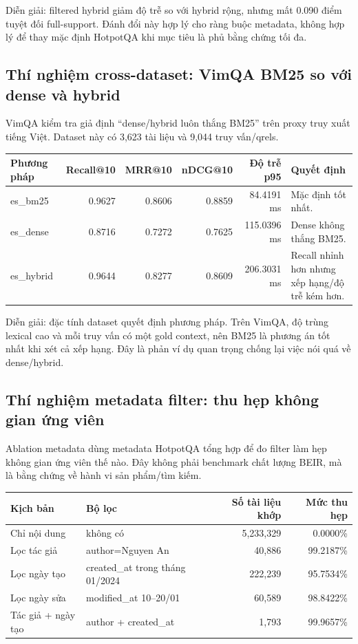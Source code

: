 \documentclass[11pt,a4paper]{article}
\begin{document}
Diễn giải: filtered hybrid giảm độ trễ so với hybrid rộng, nhưng mất 0.090 điểm tuyệt đối
full-support. Đánh đổi này hợp lý cho ràng buộc metadata, không hợp lý để thay mặc định
HotpotQA khi mục tiêu là phủ bằng chứng tối đa.

\subsection{Thí nghiệm cross-dataset: VimQA BM25 so với dense và hybrid}

VimQA kiểm tra giả định ``dense/hybrid luôn thắng BM25'' trên proxy truy xuất tiếng Việt.
Dataset này có 3,623 tài liệu và 9,044 truy vấn/qrels.

\small
\begin{tabularx}{\textwidth}{>{\ttfamily\raggedright\arraybackslash}p{} r r r r Y}
\toprule
Phương pháp & Recall@10 & MRR@10 & nDCG@10 & Độ trễ p95 & Quyết định \\
\midrule
es\_bm25 & 0.9627 & 0.8606 & 0.8859 & 84.4191 ms & Mặc định tốt nhất. \\
es\_dense & 0.8716 & 0.7272 & 0.7625 & 115.0396 ms & Dense không thắng BM25. \\
es\_hybrid & 0.9644 & 0.8277 & 0.8609 & 206.3031 ms & Recall nhỉnh hơn nhưng xếp hạng/độ trễ kém hơn. \\
\bottomrule
\end{tabularx}
\normalsize

Diễn giải: đặc tính dataset quyết định phương pháp. Trên VimQA, độ trùng lexical cao và mỗi truy vấn
có một gold context, nên BM25 là phương án tốt nhất khi xét cả xếp hạng. Đây là phản ví dụ quan trọng chống
lại việc nói quá về dense/hybrid.

\subsection{Thí nghiệm metadata filter: thu hẹp không gian ứng viên}

Ablation metadata dùng metadata HotpotQA tổng hợp để đo filter làm hẹp không gian ứng viên thế nào.
Đây không phải benchmark chất lượng BEIR, mà là bằng chứng về hành vi sản phẩm/tìm kiếm.

\small
\begin{tabularx}{\textwidth}{>{\raggedright\arraybackslash}p{} Y r r}
\toprule
Kịch bản & Bộ lọc & Số tài liệu khớp & Mức thu hẹp \\
\midrule
Chỉ nội dung & không có & 5,233,329 & 0.0000\% \\
Lọc tác giả & author=Nguyen An & 40,886 & 99.2187\% \\
Lọc ngày tạo & created\_at trong tháng 01/2024 & 222,239 & 95.7534\% \\
Lọc ngày sửa & modified\_at 10--20/01 & 60,589 & 98.8422\% \\
Tác giả + ngày tạo & author + created\_at & 1,793 & 99.9657\% \\
\bottomrule
\end{tabularx}
\normalsize
\end{document}
